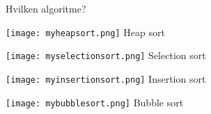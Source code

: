 \documentclass[norsk, handout]{beamer}
\begin{document}
    \begin{frame}{Hvilken algoritme?}
      \begin{center} 

        \texttt{[image: myheapsort.png]}
        \pause
        Heap sort

        \vspace{0.6cm}

        \pause
        \texttt{[image: myselectionsort.png]}
        \pause
        Selection sort

        \vspace{0.6cm}

        \pause
        \texttt{[image: myinsertionsort.png]}
        \pause
        Insertion sort

        \vspace{0.6cm}

        \pause
        \texttt{[image: mybubblesort.png]}
        \pause
        Bubble sort
      \end{center}
    \end{frame}
\end{document}
